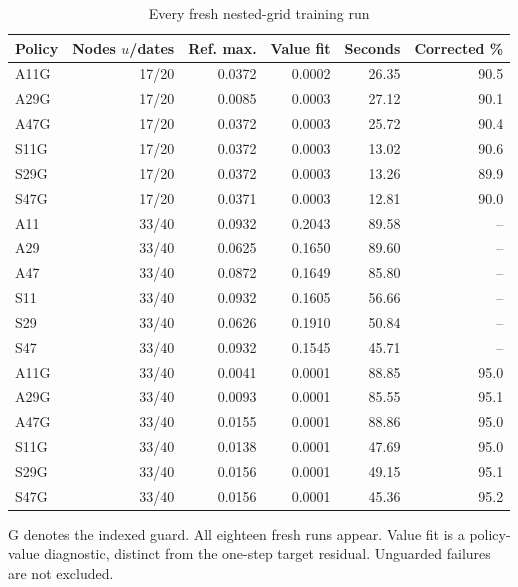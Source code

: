 \begin{table}[htbp]
\centering\small\setlength{\tabcolsep}{4pt}
\caption{Every fresh nested-grid training run}\label{tab:r9nestedall}
\begin{tabular}{lrrrrr}
\toprule
Policy & Nodes $u$/dates & Ref. max. & Value fit & Seconds & Corrected \% \\
\midrule
A11G & 17/20 & 0.0372 & 0.0002 & 26.35 & 90.5 \\
A29G & 17/20 & 0.0085 & 0.0003 & 27.12 & 90.1 \\
A47G & 17/20 & 0.0372 & 0.0003 & 25.72 & 90.4 \\
S11G & 17/20 & 0.0372 & 0.0003 & 13.02 & 90.6 \\
S29G & 17/20 & 0.0372 & 0.0003 & 13.26 & 89.9 \\
S47G & 17/20 & 0.0371 & 0.0003 & 12.81 & 90.0 \\
A11 & 33/40 & 0.0932 & 0.2043 & 89.58 & -- \\
A29 & 33/40 & 0.0625 & 0.1650 & 89.60 & -- \\
A47 & 33/40 & 0.0872 & 0.1649 & 85.80 & -- \\
S11 & 33/40 & 0.0932 & 0.1605 & 56.66 & -- \\
S29 & 33/40 & 0.0626 & 0.1910 & 50.84 & -- \\
S47 & 33/40 & 0.0932 & 0.1545 & 45.71 & -- \\
A11G & 33/40 & 0.0041 & 0.0001 & 88.85 & 95.0 \\
A29G & 33/40 & 0.0093 & 0.0001 & 85.55 & 95.1 \\
A47G & 33/40 & 0.0155 & 0.0001 & 88.86 & 95.0 \\
S11G & 33/40 & 0.0138 & 0.0001 & 47.69 & 95.0 \\
S29G & 33/40 & 0.0156 & 0.0001 & 49.15 & 95.1 \\
S47G & 33/40 & 0.0156 & 0.0001 & 45.36 & 95.2 \\
\bottomrule
\end{tabular}
\par\vspace{3pt}\begin{minipage}{0.97\linewidth}\footnotesize G denotes the indexed guard. All eighteen fresh runs appear. Value fit is a policy-value diagnostic, distinct from the one-step target residual. Unguarded failures are not excluded.\end{minipage}
\end{table}
